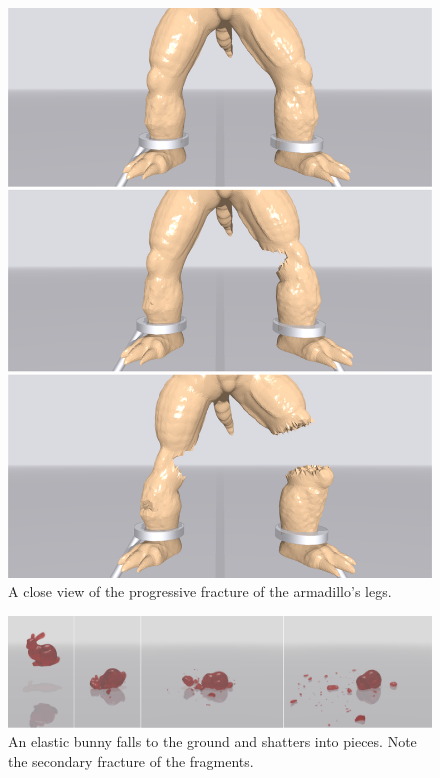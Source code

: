 \begin{figure}[t]
  \centering
  \includegraphics[width=\linewidth]{./figs/demo_tear_armadillo_close_view.png}
  \caption{\label{fig:11}
  A close view of the progressive fracture of the armadillo's legs.
}
\end{figure}
\begin{figure}[t]
  \centering
  \includegraphics[width=\linewidth]{./figs/demo_fall_bunny.png}
  \caption{\label{fig:12}
  An elastic bunny falls to the ground and shatters into pieces. Note the secondary fracture of the fragments.
}
\end{figure}


